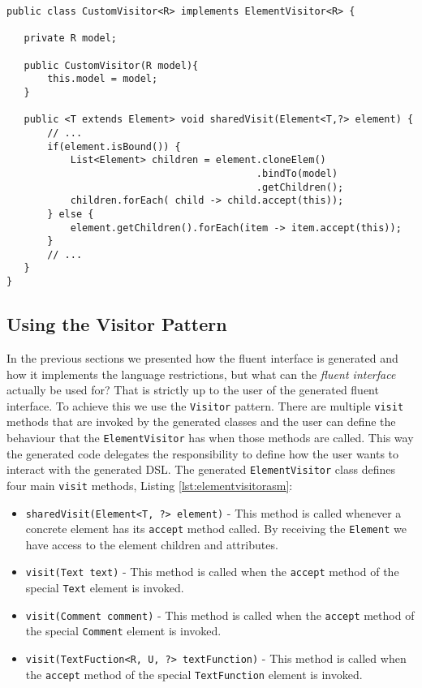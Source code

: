 \bigskip


\begin{minipage}{\linewidth}
\begin{lstlisting}[caption={Visitor with Binding Support},label={lst:visitorbinding}]
public class CustomVisitor<R> implements ElementVisitor<R> {

   private R model;

   public CustomVisitor(R model){
       this.model = model;
   }
    
   public <T extends Element> void sharedVisit(Element<T,?> element) {
       // ...
       if(element.isBound()) {
           List<Element> children = element.cloneElem()
                                           .bindTo(model)
                                           .getChildren();
           children.forEach( child -> child.accept(this));
       } else {
           element.getChildren().forEach(item -> item.accept(this));
       }
       // ...
   }
}
\end{lstlisting}
\end{minipage}
        
\subsection{Using the Visitor Pattern}
\label{sec:xsdasmvisitor}

In the previous sections we presented how the fluent interface is generated and how it implements the language restrictions, but what can the \textit{fluent interface} actually be used for? That is strictly up to the user of the generated fluent interface. To achieve this we use the \texttt{Visitor} pattern\citep{gamma1994design}. There are multiple \texttt{visit} methods that are invoked by the generated classes and the user can define the behaviour that the \texttt{ElementVisitor} has when those methods are called. This way the generated code delegates the responsibility to define how the user wants to interact with the generated \ac{DSL}. The generated \texttt{ElementVisitor} class defines four main \texttt{visit} methods, Listing \ref{lst:elementvisitorasm}:

\begin{itemize}
	\item \texttt{sharedVisit(Element<T, ?> element)} - This method is called whenever a concrete element has its \texttt{accept} method called. By receiving the \texttt{Element} we have access to the element children and attributes.
	\item \texttt{visit(Text text)} - This method is called when the \texttt{accept} method of the special \texttt{Text} element is invoked.
	\item \texttt{visit(Comment comment)} - This method is called when the \texttt{accept} method of the special \texttt{Comment} element is invoked.
	\item \texttt{visit(TextFuction<R, U, ?> textFunction)} - This method is called when the \texttt{accept} method of the special \texttt{TextFunction} element is invoked.
\end{itemize}	

